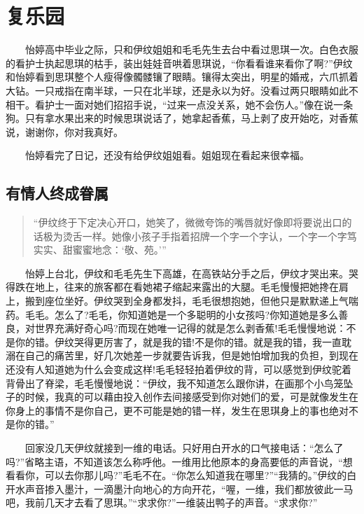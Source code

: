 \documentclass[12pt,UTF8]{ctexbook}
\begin{document}
\hypertarget{fuleyuan}{%
\chapter{复乐园}\label{fuleyuan}}

　　怡婷高中毕业之际，只和伊纹姐姐和毛毛先生去台中看过思琪一次。白色衣服的看护士执起思琪的枯手，装出娃娃音哄着思琪说，\enquote{你看看谁来看你了啊?}伊纹和怡婷看到思琪整个人瘦得像髑髅镶了眼睛。镶得太突出，明星的婚戒，六爪抓着大钻。一只戒指在南半球，一只在北半球，还是永以为好。没看过两只眼睛如此不相干。看护士一面对她们招招手说，\enquote{过来一点没关系，她不会伤人。}像在说一条狗。只有拿水果出来的时候思琪说话了，她拿起香蕉，马上剥了皮开始吃，对香蕉说，谢谢你，你对我真好。

　　怡婷看完了日记，还没有给伊纹姐姐看。姐姐现在看起来很幸福。

\hypertarget{ux6709ux60c5ux4ebaux7ec8ux6210ux7737ux5c5e}{%
\section*{有情人终成眷属}\label{ux6709ux60c5ux4ebaux7ec8ux6210ux7737ux5c5e}}

\begin{quote}
\enquote{伊纹终于下定决心开口，她笑了，微微夸饰的嘴唇就好像即将要说出口的话极为烫舌一样。她像小孩子手指着招牌一个字一个字认，一个字一个字笃实实、甜蜜蜜地念：\enquote{敬、苑。}}
\end{quote}

　　怡婷上台北，伊纹和毛毛先生下高雄，在高铁站分手之后，伊纹才哭出来。哭得跌在地上，往来的旅客都在看她裙子缩起来露出的大腿。毛毛慢慢把她搀在肩上，搬到座位坐好。伊纹哭到全身都发抖，毛毛很想抱她，但他只是默默递上气喘药。毛毛。怎么了?毛毛，你知道她是一个多聪明的小女孩吗?你知道她是多么善良，对世界充满好奇心吗?而现在她唯一记得的就是怎么剥香蕉!毛毛慢慢地说：不是你的错。伊纹哭得更厉害了，就是我的错!不是你的错。就是我的错，我一直耽溺在自己的痛苦里，好几次她差一步就要告诉我，但是她怕增加我的负担，到现在还没有人知道她为什么会变成这样!毛毛轻轻拍着伊纹的背，可以感觉到伊纹驼着背骨出了脊梁，毛毛慢慢地说：\enquote{伊纹，我不知道怎么跟你讲，在画那个小鸟笼坠子的时候，我真的可以藉由投入创作去间接感受到你对她们的爱，可是就像发生在你身上的事情不是你自己，更不可能是她的错一样，发生在思琪身上的事也绝对不是你的错。}

　　回家没几天伊纹就接到一维的电话。只好用白开水的口气接电话：\enquote{怎么了吗?}省略主语，不知道该怎么称呼他。一维用比他原本的身高要低的声音说，\enquote{想看看你，可以去你那儿吗?}毛毛不在。\enquote{你怎么知道我在哪里?}\enquote{我猜的。}伊纹的白开水声音掺入墨汁，一滴墨汁向地心的方向开花，\enquote{喔，一维，我们都放彼此一马吧，我前几天才去看了思琪。}\enquote{求求你?}一维装出鸭子的声音。\enquote{求求你?}
\end{document}
